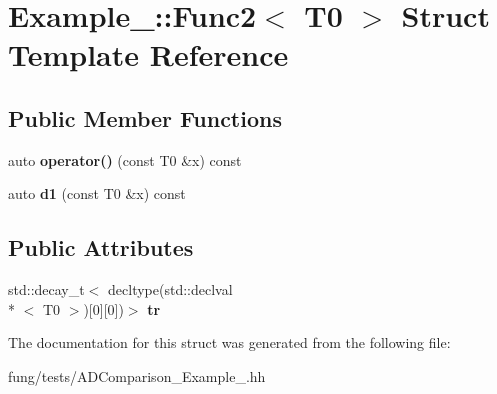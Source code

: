 \hypertarget{structExample__5_1_1Func2}{\section{Example\-\_\-:\-:Func2$<$ T0 $>$ Struct Template Reference}
\label{structExample__5_1_1Func2}
}
\subsection*{Public Member Functions}
\begin{DoxyCompactItemize}
\item 
\hypertarget{structExample__5_1_1Func2_a99c6df06b58820799666308e6b379019}{auto {\bfseries operator()} (const T0 \&x) const }\label{structExample__5_1_1Func2_a99c6df06b58820799666308e6b379019}

\item 
\hypertarget{structExample__5_1_1Func2_a68a564411f2f96ee70afec14dbbd3a0b}{auto {\bfseries d1} (const T0 \&x) const }\label{structExample__5_1_1Func2_a68a564411f2f96ee70afec14dbbd3a0b}

\end{DoxyCompactItemize}
\subsection*{Public Attributes}
\begin{DoxyCompactItemize}
\item 
\hypertarget{structExample__5_1_1Func2_afbce1258602b12354f2fab11947f76d4}{std\-::decay\-\_\-t$<$ decltype(std\-::declval\\*
$<$ T0 $>$)\mbox{[}0\mbox{]}\mbox{[}0\mbox{]})$>$ {\bfseries tr}}\label{structExample__5_1_1Func2_afbce1258602b12354f2fab11947f76d4}

\end{DoxyCompactItemize}


The documentation for this struct was generated from the following file\-:\begin{DoxyCompactItemize}
\item 
fung/tests/A\-D\-Comparison\-\_\-\-Example\-\_.\-hh\end{DoxyCompactItemize}
